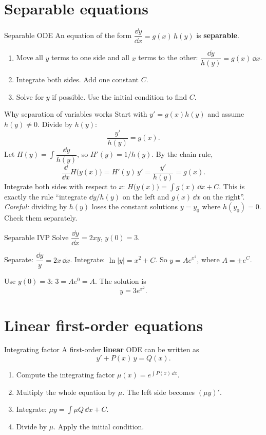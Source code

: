 \section{Separable equations}

\begin{methodbox}{Separable ODE}
An equation of the form $\dfrac{\dd y}{\dd x} = g(x)\,h(y)$ is \textbf{separable}.
\begin{enumerate}
  \item Move all $y$ terms to one side and all $x$ terms to the other: $\dfrac{\dd y}{h(y)} = g(x)\,\dd x$.
  \item Integrate both sides. Add one constant $C$.
  \item Solve for $y$ if possible. Use the initial condition to find $C$.
\end{enumerate}
\end{methodbox}

\begin{derivbox}{Why separation of variables works}
Start with $y' = g(x)h(y)$ and assume $h(y)\neq0$. Divide by $h(y)$:
\[ \frac{y'}{h(y)} = g(x). \]
Let $H(y) = \int \dfrac{\dd y}{h(y)}$, so $H'(y) = 1/h(y)$. By the chain rule,
\[ \frac{\dd}{\dd x}H\big(y(x)\big) = H'(y)\,y' = \frac{y'}{h(y)} = g(x). \]
Integrate both sides with respect to $x$: $H\big(y(x)\big) = \int g(x)\,\dd x + C$. This is exactly the rule ``integrate $\dd y/h(y)$ on the left and $g(x)\,\dd x$ on the right''. \emph{Careful:} dividing by $h(y)$ loses the constant solutions $y=y_0$ where $h(y_0)=0$. Check them separately.
\end{derivbox}

\begin{examplebox}{Separable IVP}
Solve $\dfrac{\dd y}{\dd x} = 2xy$, \quad $y(0)=3$.

Separate: $\dfrac{\dd y}{y} = 2x\,\dd x$. Integrate: $\ln|y| = x^2 + C$. So $y = Ae^{x^2}$, where $A = \pm e^{C}$.

Use $y(0)=3$: $3 = Ae^{0} = A$. The solution is
\[ y = 3e^{x^2}. \]
\end{examplebox}

\section{Linear first-order equations}

\begin{methodbox}{Integrating factor}
A first-order \textbf{linear} ODE can be written as
\[ y' + P(x)\,y = Q(x). \]
\begin{enumerate}
  \item Compute the integrating factor $\mu(x) = e^{\int P(x)\,\dd x}$.
  \item Multiply the whole equation by $\mu$. The left side becomes $(\mu y)'$.
  \item Integrate: $\mu y = \int \mu Q\,\dd x + C$.
  \item Divide by $\mu$. Apply the initial condition.
\end{enumerate}
\end{methodbox}

